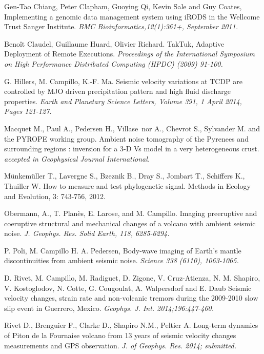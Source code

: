 \documentclass[a4paper, 10pt]{article}
\begin{document}
\begin{multicols}{2}
\begin{thebibliography}{9}
Gen-Tao Chiang, Peter Clapham, Guoying Qi, Kevin Sale and Guy Coates,
Implementing a genomic data management system using iRODS in the Wellcome Trust Sanger Institute.
{\em BMC Bioinformatics,12(1):361+, September 2011.}

Beno\^it Claudel, Guillaume Huard, Olivier Richard.
TakTuk, Adaptive Deployment of Remote Executions.
{\em Proceedings of the International Symposium on High Performance Distributed Computing (HPDC) (2009) 91-100.}
 
G. Hillers, M. Campillo, K.-F. Ma.
Seismic velocity variations at TCDP are controlled by MJO driven precipitation pattern and high fluid discharge properties.
{\em Earth and Planetary Science Letters, Volume 391, 1 April 2014, Pages 121-127.}

Macquet M., Paul A., Pedersen H., Villase~nor A., Chevrot S., Sylvander M. and the PYROPE working group.
Ambient noise tomography of the Pyrenees and surrounding regions : inversion for a 3-D Vs model in a very heterogeneous crust.
{\em accepted in Geophysical Journal International.}

M\"unkem\"uller T., Lavergne S., Bzeznik B., Dray S., Jombart T.,
Schiffers K., Thuiller W. 
How to measure and test phylogenetic signal. Methods in Ecology and Evolution, 3: 743-756, 2012.

Obermann, A., T. Plan\`es, E. Larose, and M. Campillo.
Imaging preeruptive and coeruptive structural and mechanical changes of a volcano with ambient seismic noise.
{\em J. Geophys. Res. Solid Earth, 118, 6285-6294. }

P. Poli, M. Campillo H. A. Pedersen,
Body-wave imaging of Earth's mantle discontinuities from ambient seismic noise.
{\em Science 338 (6110), 1063-1065.}

D. Rivet, M. Campillo, M. Radiguet, D. Zigone, V. Cruz-Atienza, N. M. Shapiro, V. Kostoglodov, N. Cotte,
G. Cougoulat, A. Walpersdorf and E. Daub
Seismic velocity changes, strain rate and non-volcanic tremors during the 2009-2010 slow slip event in Guerrero, Mexico. 
{\em Geophys. J. Int. 2014;196:447-460. }

Rivet D., Brenguier F., Clarke D., Shapiro N.M., Peltier A. 
Long-term dynamics of Piton de la Fournaise volcano from 13 years of seismic velocity changes measurements and GPS observation.
{\em J. of Geophys. Res. 2014; submitted.} 

\end{thebibliography}

\end{multicols}
\end{document}
